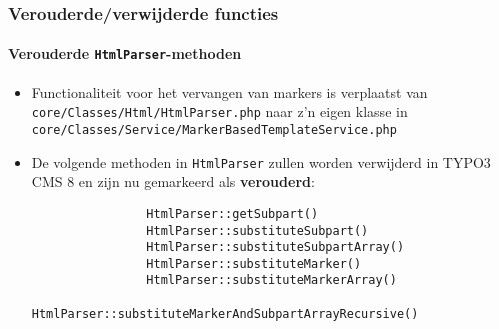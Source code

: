 
\begin{frame}[fragile]
	\frametitle{Verouderde/verwijderde functies}
	\framesubtitle{Verouderde \texttt{HtmlParser}-methoden}


	\begin{itemize}

		\item Functionaliteit voor het vervangen van markers is verplaatst van\newline
			\texttt{core/Classes/Html/HtmlParser.php}\newline
			naar z'n eigen klasse in\newline
			\texttt{core/Classes/Service/MarkerBasedTemplateService.php}

		\item De volgende methoden in \texttt{HtmlParser} zullen worden verwijderd
			in TYPO3 CMS 8 en zijn nu gemarkeerd als \textbf{verouderd}:

			\begin{lstlisting}
				HtmlParser::getSubpart()
				HtmlParser::substituteSubpart()
				HtmlParser::substituteSubpartArray()
				HtmlParser::substituteMarker()
				HtmlParser::substituteMarkerArray()
				HtmlParser::substituteMarkerAndSubpartArrayRecursive()
			\end{lstlisting}

	\end{itemize}

\end{frame}



